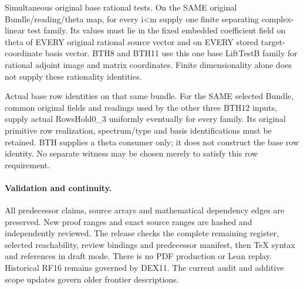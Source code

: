 \begin{description}[style=nextline]
\item[33. BASE\_THETA\_RATIONAL\_TESTS --- C] Simultaneous original base rational tests. On the SAME original Bundle/reading/theta map, for every i<m supply one finite separating complex-linear test family. Its values must lie in the fixed embedded coefficient field on theta of EVERY original rational source vector and on EVERY stored target-coordinate basis vector. BTH8 and BTH11 use this one base LiftTestB family for rational adjoint image and matrix coordinates. Finite dimensionality alone does not supply these rationality identities.

\item[34. SLR\_BASE\_ROWS\_PRODUCER --- C] Actual base row identities on that same bundle. For the SAME selected Bundle, common original fields and readings used by the other three BTH12 inputs, supply actual RowsHold0\_3 uniformly eventually for every family. Its original primitive row realization, spectrum/type and basis identifications must be retained. BTH supplies a theta consumer only; it does not construct the base row identity. No separate witness may be chosen merely to satisfy this row requirement.

\end{description}

\paragraph{Validation and continuity.}
All predecessor claims, source arrays and mathematical dependency
edges are preserved. New proof ranges and exact source ranges are
hashed and independently reviewed. The release checks the complete
remaining register, selected reachability, review bindings and
predecessor manifest, then TeX syntax and references in draft mode.
There is no PDF production or Lean replay. Historical RF16 remains
governed by DEX11. The current audit and additive scope updates
govern older frontier descriptions.
